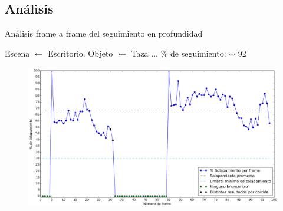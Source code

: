 \documentclass[]{beamer}
\begin{document}
\subsection{Análisis}
\begin{frame}{Análisis frame a frame del seguimiento en profundidad}


    Escena $\leftarrow$ Escritorio. Objeto $\leftarrow$ Taza $\dots$ \% de seguimiento: $\sim$ 92
    \vspace*{-15pt}
    \begin{figure}
        \centering
        \includegraphics[scale=0.24]{img/frame_a_frame_depth-taza.png}
    \end{figure}

\end{frame}
\end{document}
